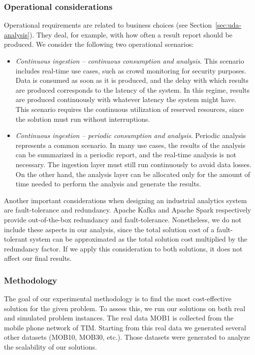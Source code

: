 {\subsubsection{Operational considerations}
Operational requirements are related to business choices (see Section~\ref{sec:uda-analysis}). They deal, for example, with how often a result report should be produced. We consider the following two operational scenarios:
\begin{itemize}
\item \textit{Continuous ingestion -- continuous consumption and analysis}. This scenario includes real-time use cases, such as crowd monitoring for security purposes. Data is consumed as soon as it is produced, and the delay with which results are produced corresponds to the latency of the system. In this regime, results are produced continuously with whatever latency the system might have. This scenario requires the continuous utilization of reserved resources, since the solution must run without interruptions.
\item \textit{Continuous ingestion -- periodic consumption and analysis}. Periodic analysis represents a common scenario. In many use cases, the results of the analysis can be summarized in a periodic report, and the real-time analysis is not necessary. The ingestion layer must still run continuously to avoid data losses. On the other hand, the analysis layer can be allocated only for the amount of time needed to perform the analysis and generate the results.
\end{itemize}

Another important considerations when designing an industrial analytics system are fault-tolerance and redundancy. Apache Kafka and Apache Spark respectively provide out-of-the-box redundancy and fault-tolerance. Nonetheless, we do not include these aspects in our analysis, since the total solution cost of a fault-tolerant system can be approximated as the total solution cost multiplied by the redundancy factor. If we apply this consideration to both solutions, it does not affect our final results.

\subsubsection{Methodology}
The goal of our experimental methodology is to find the most cost-effective solution for the given problem. To assess this, we run our solutions on both real and simulated problem instances. The real data MOB1 is collected from the mobile phone network of TIM. Starting from this real data we generated several other datasets (MOB10, MOB30, etc.). Those datasets were generated to analyze the scalability of our solutions. 

}
